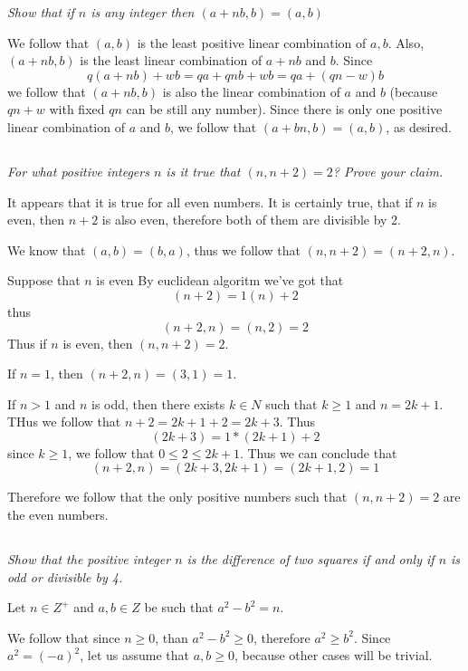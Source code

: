 \documentclass[11pt,oneside,titlepage]{book}
\begin{document}
\textit{Show that if $n$ is any integer then $(a + nb, b) = (a, b)$}

We follow that $(a, b)$ is the least positive linear combination of $a, b$. Also,
$(a + nb, b)$ is the least linear combination of $a + nb$ and $b$. Since
$$q(a + nb) + wb = qa + qnb + wb = qa + (qn - w) b$$
we follow that $(a + nb, b)$ is also the linear combination of $a$ and $b$ (because $qn + w$
with fixed $qn$ can be still any number). Since
there is only one positive linear combination of $a$ and $b$, we follow that
$(a + bn, b) = (a, b)$, as desired.

\subsection{}

\textit{For what positive integers $n$ is it true that $(n, n + 2) = 2$? Prove your claim.}

It appears that it is true for all even numbers. It is certainly true, that if $n$
is even, then $n + 2$ is also even, therefore both of them are divisible by 2.

We know that $(a, b) = (b, a)$, thus we follow that $(n, n + 2) = (n + 2, n)$.

Suppose that $n$ is even
By euclidean algoritm we've got that
$$(n + 2) = 1(n) + 2$$
thus
$$(n + 2, n) = (n, 2) = 2$$
Thus if $n$ is even, then $(n, n + 2) = 2$.

If $n = 1$, then $(n + 2, n) = (3, 1) = 1$.

If $n > 1$ and $n$ is odd, then there exists $k \in N$ such that $k \geq  1$ and  $n = 2k + 1$.
THus we follow that $n + 2 = 2k + 1 + 2 = 2k + 3$. Thus 
$$(2k + 3) = 1*(2k + 1) + 2$$
since $k \geq 1$, we follow that $0 \leq 2 \leq 2k + 1$.
Thus we can conclude that
$$(n + 2, n) = (2k + 3, 2k + 1) = (2k + 1, 2) = 1$$

Therefore we follow that the only positive numbers such that $(n, n + 2) = 2$ are
the even numbers.

\subsection{}

\textit{Show that the positive integer $n$ is the difference of two squares if and
  only if $n$ is odd or divisible by 4.}

Let $n \in Z^+$ and  $a, b \in Z$ be such that $a^2 - b^2 = n$.

We follow that since $n \geq 0$, than $a^2 - b^2 \geq 0$, therefore $a^2 \geq b^2$.
Since $a^2 = (-a)^2$, let us assume that $a, b \geq 0$, because other cases will be trivial.
\end{document}
